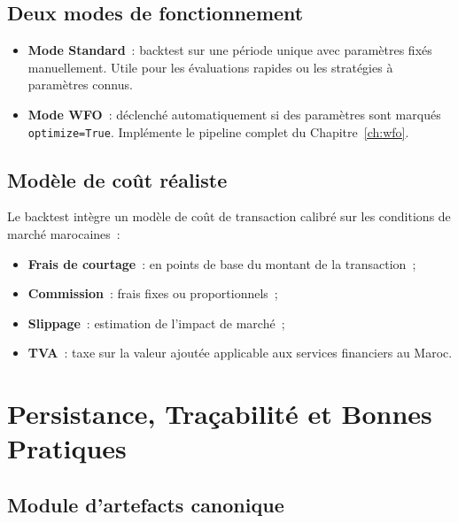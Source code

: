 \subsection{Deux modes de fonctionnement}

\begin{itemize}
    \item \textbf{Mode Standard}~: backtest sur une période unique avec paramètres
    fixés manuellement. Utile pour les évaluations rapides ou les stratégies à
    paramètres connus.
    \item \textbf{Mode WFO}~: déclenché automatiquement si des paramètres sont
    marqués \texttt{optimize=True}. Implémente le pipeline complet du
    Chapitre~\ref{ch:wfo}.
\end{itemize}

\subsection{Modèle de coût réaliste}

Le backtest intègre un modèle de coût de transaction calibré sur les conditions
de marché marocaines~:

\begin{itemize}
    \item \textbf{Frais de courtage}~: en points de base du montant de la transaction~;
    \item \textbf{Commission}~: frais fixes ou proportionnels~;
    \item \textbf{Slippage}~: estimation de l'impact de marché~;
    \item \textbf{TVA}~: taxe sur la valeur ajoutée applicable aux services
    financiers au Maroc.
\end{itemize}


\section{Persistance, Traçabilité et Bonnes Pratiques}
\label{sec:persistance}

\subsection{Module d'artefacts canonique}


